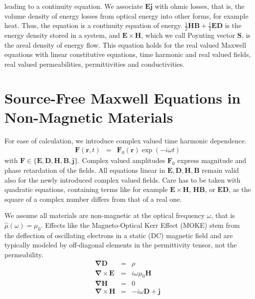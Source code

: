 \documentclass[12pt,a4paper,twoside,openright,BCOR10mm,headsepline,titlepage,abstracton,chapterprefix,final]{scrreprt}
\newcommand\Vector[1]{{\mathbf{#1}}}
\newcommand\vacuum{0}
\newcommand\Nabla{\Vector{\nabla}}
\newcommand\Tensor[1]{\hat{#1}}
\newcommand\scalarEfield{E}
\newcommand\scalarBfield{B}
\newcommand\scalarHfield{H}
\newcommand\scalarDfield{D}
\newcommand\Efield{\Vector{\scalarEfield}}
\newcommand\Bfield{\Vector{\scalarBfield}}
\newcommand\Hfield{\Vector{\scalarHfield}}
\newcommand\Dfield{\Vector{\scalarDfield}}
\newcommand\permeability{\Tensor{\mu}}
\newcommand\vacuumpermeability{\mu_{\vacuum}}
\newcommand\currentdensity{\Vector{j}}
\newcommand\chargedensity{\rho}
\begin{document}
leading to a continuity equation. 
We associate $\Efield \currentdensity$ with ohmic losses, that is, the volume density of energy losses from optical energy into other forms, for example heat.
Thus, the equation is a continuity equation of energy.
$\frac{1}{2} \Hfield \Bfield + \frac{1}{2} \Efield \Dfield$ is the energy density stored in a system, 
and $\Efield \times \Hfield$, which we call Poynting vector $\Vector{S}$, is the areal density of energy flow. 
This equation holds for the real valued Maxwell equations with linear constitutive equations, time harmonic and real valued fields, real valued permeabilities, permittivities and conductivities.

\section{Source-Free Maxwell Equations in Non-Magnetic Materials}
\label{sec:sourcefreemaxwell}
For ease of calculation, we introduce complex valued time harmonic dependence.
\begin{eqnarray}
 \Vector{F}(\Vector{r},t) &=& \Vector{F}_0(\Vector{r}) \exp(-i \omega t)
\end{eqnarray}
with $\Vector{F} \in \{ \Efield, \Dfield, \Hfield, \Bfield, \currentdensity \}$.
Complex valued amplitudes $\Vector{F}_0$ express magnitude and phase retardation of the fields.
All equations linear in $\Efield,\Dfield,\Hfield,\Bfield$ remain valid also for the newly introduced complex valued fields.
Care has to be taken with quadratic equations, containing terms like for example $\Efield \times \Hfield$, $\Hfield \Bfield$, or $\Efield \Dfield$,
as the square of a complex number differs from that of a real one.

We assume all materials are non-magnetic at the optical frequency $\omega$, that is $\permeability(\omega) = \vacuumpermeability$. 
Effects like the Magneto-Optical Kerr Effect (MOKE) stem from the deflection of oscillating electrons in a static (DC) magnetic field and are typically modeled by off-diagonal elements in the permittivity tensor, not the permeability.
\begin{subequations}
\begin{eqnarray}
  \Nabla \Dfield &=& \chargedensity 					\\
  \Nabla \times \Efield &=& i \omega \vacuumpermeability \Hfield	\\
  \Nabla \Hfield &=& 0  					\\
  \Nabla \times \Hfield &=& - i \omega \Dfield + \currentdensity  		
\end{eqnarray}
\end{subequations}
\end{document}
